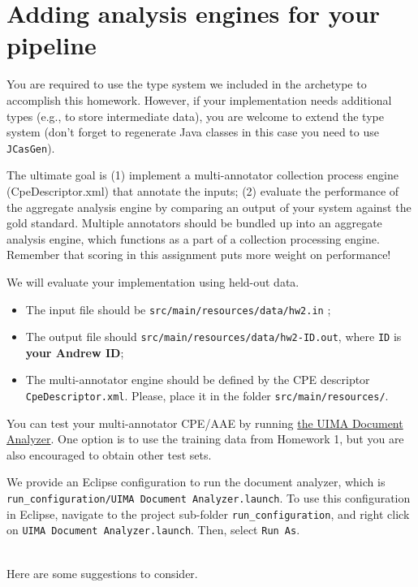 
\section{Adding analysis engines for your pipeline}

You are required to use the type system we included in the archetype to
accomplish this homework. However, if your implementation needs additional 
types (e.g., to store intermediate data), 
you are welcome to extend the type system (don't forget to regenerate Java classes in this case
you need to use \texttt{JCasGen}).

The ultimate goal is (1) implement a multi-annotator collection process engine (CpeDescriptor.xml) 
that annotate the inputs;
(2) evaluate the performance of the aggregate analysis engine by
comparing an output of your system against the gold standard.
Multiple annotators should be bundled up into an aggregate analysis engine,
which functions as a part of a collection processing engine.
Remember that scoring in this assignment puts more weight on performance!

We will evaluate your implementation using held-out data.
\begin{itemize}
\item The input file should be \texttt{src/main/resources/data/hw2.in} ;
\item The output file should  \texttt{src/main/resources/data/hw2-ID.out},
where \texttt{ID} is \textbf{your Andrew ID};
\item The multi-annotator engine should be defined by 
the CPE descriptor \texttt{CpeDescriptor.xml}.
Please, place it in the folder   \texttt{src/main/resources/}.
\end{itemize}

You can test your multi-annotator CPE/AAE by running 
\href{http://uima.apache.org/d/uimaj-2.4.0/tools.html#ugr.tools.doc_analyzer}{the UIMA Document Analyzer}.
One option is to use the training data from Homework 1, but you are also encouraged
to obtain other test sets.

We provide an Eclipse configuration to run the document analyzer,
which is \newline\texttt{run\_configuration/UIMA Document Analyzer.launch}. 
To use this configuration in Eclipse, navigate to the project sub-folder \texttt{run\_configuration},
and right click on \texttt{UIMA Document Analyzer.launch}.
Then, select \texttt{Run As}.


~\\
Here are some suggestions to consider.

